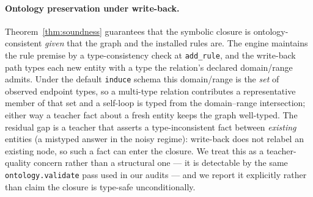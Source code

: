 \documentclass[11pt]{article}
\theoremstyle{plain}
\begin{document}
\paragraph{Ontology preservation under write-back.} Theorem~\ref{thm:soundness}
guarantees that the symbolic closure is ontology-consistent \emph{given} that
the graph and the installed rules are. The engine maintains the rule premise
by a type-consistency check at \texttt{add\_rule}, and the write-back path
types each new entity with a type the relation's declared domain/range admits.
Under the default \texttt{induce} schema this domain/range is the \emph{set} of
observed endpoint types, so a multi-type relation contributes a representative
member of that set and a self-loop is typed from the domain--range intersection;
either way a teacher fact about a fresh entity keeps the graph well-typed. The
residual gap is a teacher
that asserts a type-inconsistent fact between \emph{existing} entities (a
mistyped answer in the noisy regime): write-back does not relabel an existing
node, so such a fact can enter the closure. We treat this as a teacher-quality
concern rather than a structural one --- it is detectable by the same
\texttt{ontology.validate} pass used in our audits --- and we report it
explicitly rather than claim the closure is type-safe unconditionally.
\end{document}
